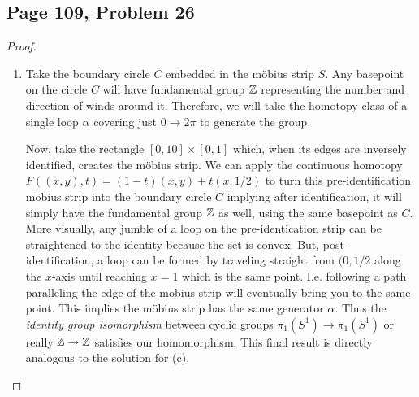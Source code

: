 \subsection*{Page 109, Problem 26}
\vspace{15pt}
\begin{proof}
    \vspace{-10pt}
    \begin{enumerate}[label = (\alph*)] The question asks for just descriptions so these aren't ultra-rigorous!
        \item Take the boundary circle $C$ embedded in the möbius strip $S$. Any basepoint on the circle $C$ will have fundamental group $\mathbb{Z}$ representing the number and direction of winds around it. Therefore, we will take the homotopy class of a single loop $\alpha$ covering just $0\to2\pi$ to generate the group. 
        
        Now, take the rectangle $[0,10] \times [0,1]$ which, when its edges are inversely identified, creates the möbius strip. We can apply the continuous homotopy $F((x,y),t) = (1-t)(x,y) + t(x,1/2)$ to turn this pre-identification möbius strip into the boundary circle $C$ implying after identification, it will simply have the fundamental group $\mathbb{Z}$ as well, using the same basepoint as $C$. More visually, any jumble of a loop on the pre-identication strip can be straightened to the identity because the set is convex. But, post-identification, a loop can be formed by traveling straight from $(0,1/2$ along the $x$-axis until reaching $x=1$ which is the same point. I.e. following a path paralleling the edge of the mobius strip will eventually bring you to the same point. This implies the möbius strip has the same generator $\alpha$. Thus the \emph{identity group isomorphism} between cyclic groups $\pi_1(S^1) \to \pi_1(S^1)$ or really $\mathbb{Z}\to\mathbb{Z}$ satisfies our homomorphism. This final result is directly analogous to the solution for (c).


\end{enumerate}
\end{proof}
